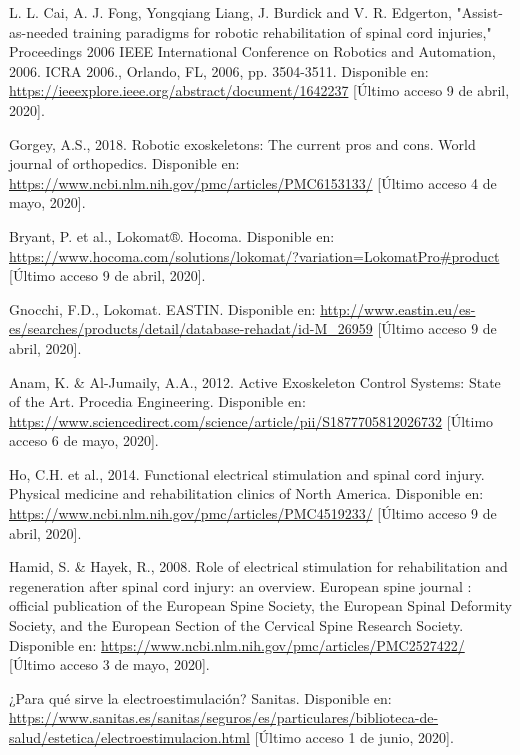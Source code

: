 \begin{thebibliography}{99}
 L. L. Cai, A. J. Fong, Yongqiang Liang, J. Burdick and V. R. Edgerton, "Assist-as-needed training paradigms for robotic rehabilitation of spinal cord injuries," Proceedings 2006 IEEE International Conference on Robotics and Automation, 2006. ICRA 2006., Orlando, FL, 2006, pp. 3504-3511. Disponible en: \url{https://ieeexplore.ieee.org/abstract/document/1642237} [Último acceso 9 de abril, 2020].

 Gorgey, A.S., 2018. Robotic exoskeletons: The current pros and cons. World journal of orthopedics. Disponible en: \url{https://www.ncbi.nlm.nih.gov/pmc/articles/PMC6153133/} [Último acceso 4 de mayo, 2020].

 Bryant, P. et al., Lokomat®. Hocoma. Disponible en: \url{https://www.hocoma.com/solutions/lokomat/?variation=LokomatPro#product} [Último acceso 9 de abril, 2020].

 Gnocchi, F.D., Lokomat. EASTIN. Disponible en: \url{http://www.eastin.eu/es-es/searches/products/detail/database-rehadat/id-M_26959} [Último acceso 9 de abril, 2020].

 Anam, K. \& Al-Jumaily, A.A., 2012. Active Exoskeleton Control Systems: State of the Art. Procedia Engineering. Disponible en: \url{https://www.sciencedirect.com/science/article/pii/S1877705812026732} [Último acceso 6 de mayo, 2020].

 Ho, C.H. et al., 2014. Functional electrical stimulation and spinal cord injury. Physical medicine and rehabilitation clinics of North America. Disponible en: \url{https://www.ncbi.nlm.nih.gov/pmc/articles/PMC4519233/} [Último acceso 9 de abril, 2020].

 Hamid, S. \& Hayek, R., 2008. Role of electrical stimulation for rehabilitation and regeneration after spinal cord injury: an overview. European spine journal : official publication of the European Spine Society, the European Spinal Deformity Society, and the European Section of the Cervical Spine Research Society. Disponible en: \url{https://www.ncbi.nlm.nih.gov/pmc/articles/PMC2527422/} [Último acceso 3 de mayo, 2020].

 ¿Para qué sirve la electroestimulación? Sanitas. Disponible en: \url{https://www.sanitas.es/sanitas/seguros/es/particulares/biblioteca-de-salud/estetica/electroestimulacion.html} [Último acceso 1 de junio, 2020].


\end{thebibliography}
